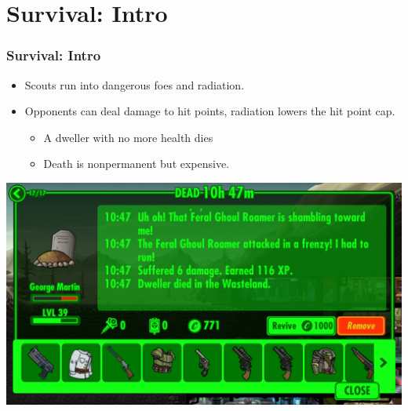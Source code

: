 \documentclass{beamer}
\begin{document}
\section{Survival: Intro}
\begin{frame}
  \frametitle{Survival: Intro}
  \begin{itemize}
  \item Scouts run into dangerous foes and radiation.
  \item Opponents can deal damage to hit points, radiation lowers the hit point cap.
  \begin{itemize}
  \item A dweller with no more health dies
  \item Death is nonpermanent but expensive.
  \end{itemize}
  \end{itemize}
\end{frame}

\begin{frame}
\centering
  \includegraphics[width = .9\textwidth]{death}
  \hfill\\
\end{frame}
\end{document}
